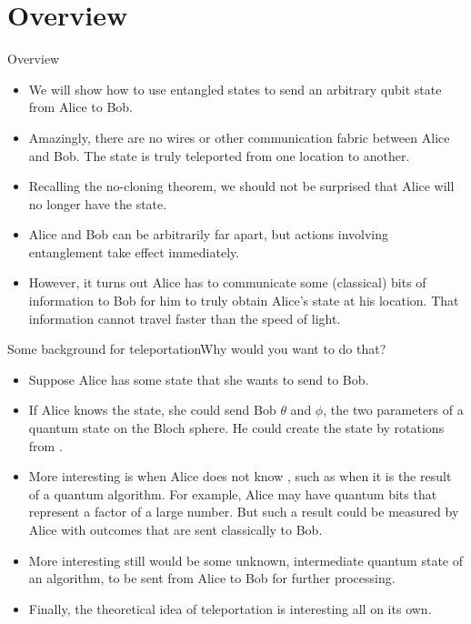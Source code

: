 
\section*{Overview}
\begin{frame}{Overview}
    \begin{itemize}[<+->]
        \item We will show how to use entangled states to send an arbitrary qubit state from Alice to Bob.
        \item Amazingly, there are no wires or other communication fabric between Alice and Bob.  The state is truly teleported from one location to another.
        \item Recalling the no-cloning theorem, we should not be surprised that Alice will no longer have the state.
        \item Alice and Bob can be arbitrarily far apart, but actions involving entanglement take effect immediately.
        \item However, it turns out Alice has to communicate some (classical) bits of information to Bob for him to truly obtain Alice's state at his location.  That information cannot travel faster than the speed of light.
    \end{itemize}
\end{frame}

\begin{frame}{Some background for teleportation}{Why would you want to do that?}
\begin{itemize}[<+->]
    \item Suppose Alice has some state \QState{} that she wants to send to Bob.
    \item If Alice knows the state, she could send Bob $\theta$ and $\phi$, the two parameters of a quantum state on the Bloch sphere.  He could create the state by rotations from \QZero{}.
    \item More interesting is when Alice does not know \QState{}, such as when it is the result of a quantum algorithm.  For example, Alice may have quantum bits that represent a factor of a large number.  But such a result could be measured by Alice with outcomes that are sent classically to Bob.
    \item More interesting still would be some unknown, intermediate quantum state of an algorithm, to be sent from Alice to Bob for further processing.
    \item Finally, the theoretical idea of teleportation is interesting all on its own.
\end{itemize}
    
\end{frame}


